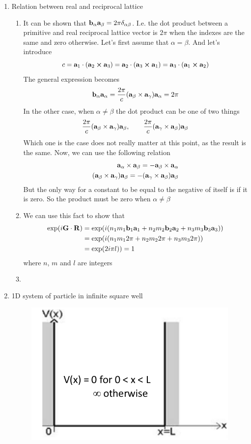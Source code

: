 \documentclass[12pt,a4paper]{article}
\begin{document}
\begin{enumerate}
		\newpage
		\item Relation between real and reciprocal lattice
		\begin{enumerate}
			\item It can be shown that $\vb{b}_{\alpha}\vb{a}_{\beta} = 2\pi\delta_{\alpha\beta}$. I.e. the dot product between a primitive and real reciprocal lattice vector is $2\pi$ when the indexes are the same and zero otherwise. Let's first assume that $\alpha = \beta$. And let's introduce
			$$c = \vb{a}_1\cdot(\vb{a}_2\cross\vb{a}_3) = \vb{a}_2\cdot(\vb{a}_3\cross\vb{a}_1) = \vb{a}_3\cdot(\vb{a}_1\cross\vb{a}_2)$$
			The general expression becomes
			$$\vb{b}_{\alpha} \vb{a}_{\alpha} = \frac{2\pi}{c}(\vb{a}_{\beta}\times\vb{a}_{\gamma})\vb{a}_{\alpha} = 2\pi$$
			In the other case, when $\alpha \neq \beta$ the dot product can be one of two things
			\begin{align*}
				\frac{2\pi}{c}(\vb{a}_{\beta}\times\vb{a}_{\gamma})\vb{a}_{\beta},
				\qquad \frac{2\pi}{c}(\vb{a}_{\gamma}\times\vb{a}_{\beta})\vb{a}_{\beta}
			\end{align*}
			Which one is the case does not really matter at this point, as the result is the same. Now, we can use the following relation
			\begin{align*}
				\vb{a}_{\alpha}\times\vb{a}_{\beta} = -\vb{a}_{\beta}\times \vb{a}_{\alpha}\\
				(\vb{a}_{\beta}\times\vb{a}_{\gamma})\vb{a}_{\beta} = -(\vb{a}_{\gamma}\times\vb{a}_{\beta})\vb{a}_{\beta}
			\end{align*}
			But the only way for a constant to be equal to the negative of itself is if it is zero. So the product must be zero when $\alpha \neq \beta$
			\item We can use this fact to show that
			\begin{align*}
				\exp(i\vb{G}\cdot\vb{R}) & = \exp(i(n_1m_1\vb{b}_1\vb{a}_1+n_2m_2\vb{b}_2\vb{a}_2+n_3m_3\vb{b}_3\vb{a}_3))\\
				& = \exp(i(n_1m_12\pi+n_2m_22\pi+n_3m_32\pi))\\
				& = \exp(2i\pi l)) = 1
			\end{align*}
			where $n$, $m$ and $l$ are integers
			\item 
		\end{enumerate}
		\newpage
		\item 1D system of particle in infinite square well
		\begin{figure}
			\centering
			\includegraphics[width=0.7\linewidth]{well}

\end{figure}
\end{enumerate}
\end{document}
